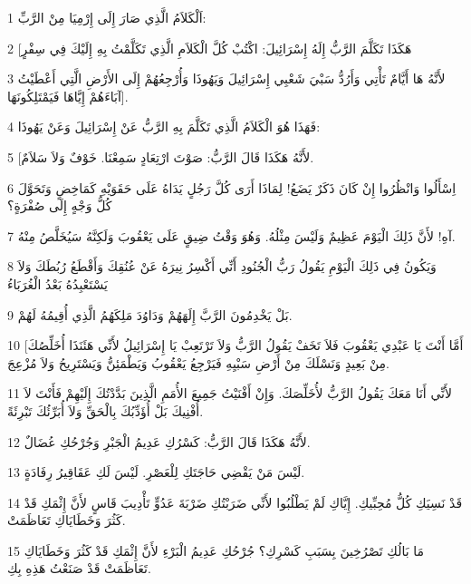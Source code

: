 \par 1 اَلْكَلاَمُ الَّذِي صَارَ إِلَى إِرْمِيَا مِنْ الرَّبِّ:
\par 2 [هَكَذَا تَكَلَّمَ الرَّبُّ إِلَهُ إِسْرَائِيلَ: اكْتُبْ كُلَّ الْكَلاَمِ الَّذِي تَكَلَّمْتُ بِهِ إِلَيْكَ فِي سِفْرٍ
\par 3 لأَنَّهُ هَا أَيَّامٌ تَأْتِي وَأَرُدُّ سَبْيَ شَعْبِي إِسْرَائِيلَ وَيَهُوذَا وَأُرْجِعُهُمْ إِلَى الأَرْضِ الَّتِي أَعْطَيْتُ آبَاءَهُمْ إِيَّاهَا فَيَمْتَلِكُونَهَا].
\par 4 فَهَذَا هُوَ الْكَلاَمُ الَّذِي تَكَلَّمَ بِهِ الرَّبُّ عَنْ إِسْرَائِيلَ وَعَنْ يَهُوذَا:
\par 5 [لأَنَّهُ هَكَذَا قَالَ الرَّبُّ: صَوْتَ ارْتِعَادٍ سَمِعْنَا. خَوْفٌ وَلاَ سَلاَمٌ.
\par 6 اِسْأَلُوا وَانْظُرُوا إِنْ كَانَ ذَكَرٌ يَضَعُ! لِمَاذَا أَرَى كُلَّ رَجُلٍ يَدَاهُ عَلَى حَقَوَيْهِ كَمَاخِضٍ وَتَحَوَّلَ كُلُّ وَجْهٍ إِلَى صُفْرَةٍ؟
\par 7 آهِ! لأَنَّ ذَلِكَ الْيَوْمَ عَظِيمٌ وَلَيْسَ مِثْلُهُ. وَهُوَ وَقْتُ ضِيقٍ عَلَى يَعْقُوبَ وَلَكِنَّهُ سَيُخَلَّصُ مِنْهُ.
\par 8 وَيَكُونُ فِي ذَلِكَ الْيَوْمِ يَقُولُ رَبُّ الْجُنُودِ أَنِّي أَكْسِرُ نِيرَهُ عَنْ عُنُقِكَ وَأَقْطَعُ رُبُطَكَ وَلاَ يَسْتَعْبِدُهُ بَعْدُ الْغُرَبَاءُ
\par 9 بَلْ يَخْدِمُونَ الرَّبَّ إِلَهَهُمْ وَدَاوُدَ مَلِكَهُمُ الَّذِي أُقِيمُهُ لَهُمْ.
\par 10 [أَمَّا أَنْتَ يَا عَبْدِي يَعْقُوبَ فَلاَ تَخَفْ يَقُولُ الرَّبُّ وَلاَ تَرْتَعِبْ يَا إِسْرَائِيلُ لأَنِّي هَئَنَذَا أُخَلِّصُكَ مِنْ بَعِيدٍ وَنَسْلَكَ مِنْ أَرْضِ سَبْيِهِ فَيَرْجِعُ يَعْقُوبُ وَيَطْمَئِنُّ وَيَسْتَرِيحُ وَلاَ مُزْعِجَ.
\par 11 لأَنِّي أَنَا مَعَكَ يَقُولُ الرَّبُّ لأُخَلِّصَكَ. وَإِنْ أَفْنَيْتُ جَمِيعَ الأُمَمِ الَّذِينَ بَدَّدْتُكَ إِلَيْهِمْ فَأَنْتَ لاَ أُفْنِيكَ بَلْ أُؤَدِّبُكَ بِالْحَقِّ وَلاَ أُبَرِّئُكَ تَبْرِئَةً.
\par 12 لأَنَّهُ هَكَذَا قَالَ الرَّبُّ: كَسْرُكِ عَدِيمُ الْجَبْرِ وَجُرْحُكِ عُضَالٌ.
\par 13 لَيْسَ مَنْ يَقْضِي حَاجَتَكِ لِلْعَصْرِ. لَيْسَ لَكِ عَقَاقِيرُ رِفَادَةٍ.
\par 14 قَدْ نَسِيَكِ كُلُّ مُحِبِّيكِ. إِيَّاكِ لَمْ يَطْلُبُوا لأَنِّي ضَرَبْتُكِ ضَرْبَةَ عَدُوٍّ تَأْدِيبَ قَاسٍ لأَنَّ إِثْمَكِ قَدْ كَثُرَ وَخَطَايَاكِ تَعَاظَمَتْ.
\par 15 مَا بَالُكِ تَصْرُخِينَ بِسَبَبِ كَسْرِكِ؟ جُرْحُكِ عَدِيمُ الْبَرْءِ لأَنَّ إِثْمَكِ قَدْ كَثُرَ وَخَطَايَاكِ تَعَاظَمَتْ قَدْ صَنَعْتُ هَذِهِ بِكِ.
